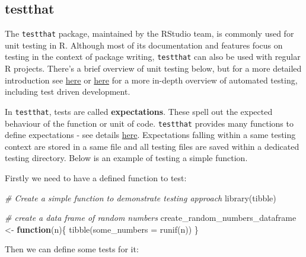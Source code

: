\documentclass[
]{book}
\newenvironment{Shaded}{\begin{snugshade}}{\end{snugshade}}
\newcommand{\AttributeTok}[1]{\textcolor[rgb]{0.77,0.63,0.00}{#1}}
\newcommand{\CommentTok}[1]{\textcolor[rgb]{0.56,0.35,0.01}{\textit{#1}}}
\newcommand{\ControlFlowTok}[1]{\textcolor[rgb]{0.13,0.29,0.53}{\textbf{#1}}}
\newcommand{\FunctionTok}[1]{\textcolor[rgb]{0.00,0.00,0.00}{#1}}
\newcommand{\NormalTok}[1]{#1}
\newcommand{\OtherTok}[1]{\textcolor[rgb]{0.56,0.35,0.01}{#1}}
\begin{document}
\hypertarget{testthat}{%
\subsection{testthat}\label{testthat}}

The \texttt{testthat} package, maintained by the RStudio team, is commonly used for unit testing in R. Although most of its documentation and features focus on testing in the context of package writing, \texttt{testthat} can also be used with regular R projects. There's a brief overview of unit testing below, but for a more detailed introduction see \href{https://katherinemwood.github.io/post/testthat/}{here} or \href{https://www.r-bloggers.com/automated-testing-with-testthat-in-practice/}{here} for a more in-depth overview of automated testing, including test driven development.

In \texttt{testthat}, tests are called \textbf{expectations}. These spell out the expected behaviour of the function or unit of code. \texttt{testthat} provides many functions to define expectations - see details \href{http://r-pkgs.had.co.nz/tests.html}{here}. Expectations falling within a same testing context are stored in a same file and all testing files are saved within a dedicated testing directory. Below is an example of testing a simple function.

Firstly we need to have a defined function to test:

\begin{Shaded}
\begin{Highlighting}[]
\CommentTok{\# Create a simple function to demonstrate testing approach}
\FunctionTok{library}\NormalTok{(tibble)}

\CommentTok{\# create a data frame of random numbers}
\NormalTok{create\_random\_numbers\_dataframe }\OtherTok{\textless{}{-}} \ControlFlowTok{function}\NormalTok{(n)\{}
  \FunctionTok{tibble}\NormalTok{(}\AttributeTok{some\_numbers =} \FunctionTok{runif}\NormalTok{(n))}
\NormalTok{\}}
\end{Highlighting}
\end{Shaded}

Then we can define some tests for it:
\end{document}

